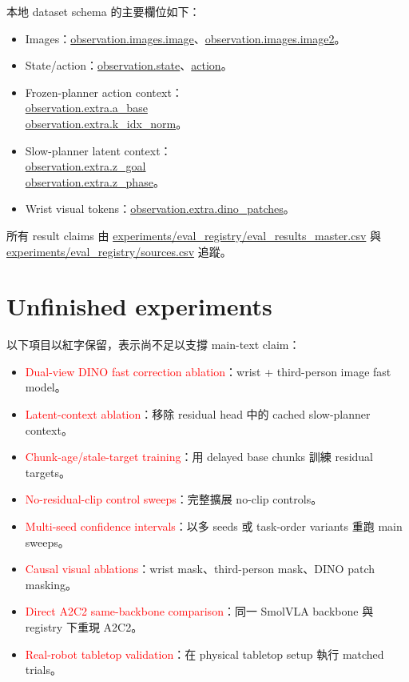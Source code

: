 本地 dataset schema 的主要欄位如下：
\begin{itemize}
  \item Images：\url{observation.images.image}、\url{observation.images.image2}。
  \item State/action：\url{observation.state}、\url{action}。
  \item Frozen-planner action context：\\
  \url{observation.extra.a_base}\\
  \url{observation.extra.k_idx_norm}。
  \item Slow-planner latent context：\\
  \url{observation.extra.z_goal}\\
  \url{observation.extra.z_phase}。
  \item Wrist visual tokens：\url{observation.extra.dino_patches}。
\end{itemize}

所有 result claims 由 \url{experiments/eval_registry/eval_results_master.csv} 與 \url{experiments/eval_registry/sources.csv} 追蹤。

\section{Unfinished experiments}

以下項目以紅字保留，表示尚不足以支撐 main-text claim：

\begin{itemize}
  \item \textcolor{red}{Dual-view DINO fast correction ablation}：wrist + third-person image fast model。
  \item \textcolor{red}{Latent-context ablation}：移除 residual head 中的 cached slow-planner context。
  \item \textcolor{red}{Chunk-age/stale-target training}：用 delayed base chunks 訓練 residual targets。
  \item \textcolor{red}{No-residual-clip control sweeps}：完整擴展 no-clip controls。
  \item \textcolor{red}{Multi-seed confidence intervals}：以多 seeds 或 task-order variants 重跑 main sweeps。
  \item \textcolor{red}{Causal visual ablations}：wrist mask、third-person mask、DINO patch masking。
  \item \textcolor{red}{Direct A2C2 same-backbone comparison}：同一 SmolVLA backbone 與 registry 下重現 A2C2。
  \item \textcolor{red}{Real-robot tabletop validation}：在 physical tabletop setup 執行 matched trials。
\end{itemize}

